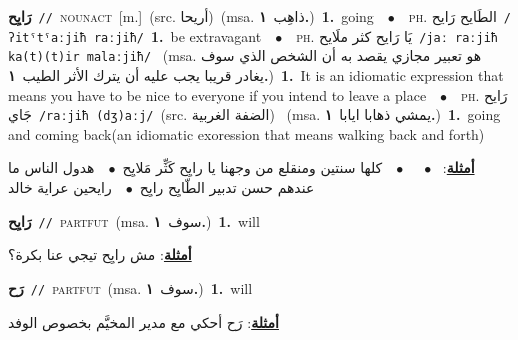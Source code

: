 \documentclass[10pt,a4paper,twoside]{article} %
\begin{document}
\begin{multicols}{2}
{\setlength\topsep{0pt}\textbf{\foreignlanguage{arabic}{رَايِح}}\ {\color{gray}\texttt{//}\color{black}}\ \textsc{noun\textunderscore act}\ [m.]\ (src. \color{gray}\foreignlanguage{arabic}{أريحا}\color{black})\ \color{gray}(msa. \foreignlanguage{arabic}{ذاهِب}~\foreignlanguage{arabic}{\textbf{١.}})\color{black}\ \textbf{1.}~going\ \ $\bullet$\ \ \textsc{ph.} \color{gray} \foreignlanguage{arabic}{الطَايح رَايح}\color{black}\ {\color{gray}\texttt{/{\sffamily ʔitˤtˤaːjiħ raːjiħ}/}\color{black}}\ \textbf{1.}~be extravagant\ \ $\bullet$\ \ \textsc{ph.} \color{gray} \foreignlanguage{arabic}{يَا رَايح كثر ملَايح}\color{black}\ {\color{gray}\texttt{/{\sffamily jaː raːjiħ ka(t)(t)ir malaːjiħ}/}\color{black}}\ \color{gray} (msa. \foreignlanguage{arabic}{هو تعبير مجازي يقصد به أن الشخص الذي سوف يغادر قريبا يجب عليه أن يترك الأثر الطيب}~\foreignlanguage{arabic}{\textbf{١.}})\color{black}\ \textbf{1.}~It is an idiomatic expression that means you have to be nice to everyone if you intend to leave a place\ \ $\bullet$\ \ \textsc{ph.} \color{gray} \foreignlanguage{arabic}{رَايح جَاي}\color{black}\ {\color{gray}\texttt{/{\sffamily raːjiħ (dʒ)aːj}/}\color{black}}\ \color{gray}(src. \foreignlanguage{arabic}{الضفة الغربية})\color{black}\ \color{gray} (msa. \foreignlanguage{arabic}{يمشي ذهابا ايابا}~\foreignlanguage{arabic}{\textbf{١.}})\color{black}\ \textbf{1.}~going and coming back(an idiomatic exoression that means walking back and forth)\  \begin{flushright}\color{gray}\foreignlanguage{arabic}{\textbf{\underline{\foreignlanguage{arabic}{أمثلة}}}: \ $\bullet$\ \  \ $\bullet$\ \  كلها سنتين ومنقلع من وجهنا يا رايِح كَثِّر مَلايِح\ $\bullet$\ \  هدول الناس ما عندهم حسن تدبير الطّايِح رايِح\ $\bullet$\ \  رايحين عراية خالد}\end{flushright}\color{black}} \vspace{2mm}

{\setlength\topsep{0pt}\textbf{\foreignlanguage{arabic}{رَايِح}}\ {\color{gray}\texttt{//}\color{black}}\ \textsc{part\textunderscore fut}\ \color{gray}(msa. \foreignlanguage{arabic}{سوف}~\foreignlanguage{arabic}{\textbf{١.}})\color{black}\ \textbf{1.}~will\  \begin{flushright}\color{gray}\foreignlanguage{arabic}{\textbf{\underline{\foreignlanguage{arabic}{أمثلة}}}: مش رايِح تيجي عنا بكرة؟}\end{flushright}\color{black}} \vspace{2mm}

{\setlength\topsep{0pt}\textbf{\foreignlanguage{arabic}{رَح}}\ {\color{gray}\texttt{//}\color{black}}\ \textsc{part\textunderscore fut}\ \color{gray}(msa. \foreignlanguage{arabic}{سوف}~\foreignlanguage{arabic}{\textbf{١.}})\color{black}\ \textbf{1.}~will\  \begin{flushright}\color{gray}\foreignlanguage{arabic}{\textbf{\underline{\foreignlanguage{arabic}{أمثلة}}}: رَح أحكي مع مدير المخيَّم بخصوص الوفد}\end{flushright}\color{black}} \vspace{2mm}


\end{multicols}
\end{document}
